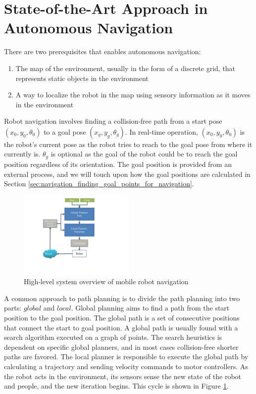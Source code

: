\section{State-of-the-Art Approach in Autonomous Navigation}
\label{sec:navigation_contemporary_navigation_practices}

There are two prerequisites that enables autonomous navigation: 

\begin{enumerate}
\item The map of the environment, usually in the form of a discrete grid, that represents static objects in the environment
\item A way to localize the robot in the map using sensory information as it moves in the environment
\end{enumerate}

Robot navigation involves finding a collision-free path from a start pose $(x_{0},y_{0},\theta_0)$ to a goal pose $(x_{g},y_{g},\theta_g)$. In real-time operation, $(x_{0},y_{0}, \theta_0)$ is the robot's current pose as the robot tries to reach to the goal pose from where it currently is. $\theta_g$ is optional as the goal of the robot could be to reach the goal position regardless of its orientation. The goal position is provided from an external process, and we will touch upon how the goal positions are calculated in Section \ref{sec:navigation_finding_goal_points_for_navigation}.



\begin{figure}[ht!]
\centering
\includegraphics[width=0.5\textwidth]{pics/navigation_overview}
\caption{High-level system overview of mobile robot navigation}
\label{fig:navigation_overview}
\end{figure}

A common approach to path planning is to divide the path planning into two parts: $global$ and $local$. Global planning aims to find a path from the start position to the goal position. The global path is a set of consecutive positions that connect the start to goal position. A global path is usually found with a search algorithm executed on a graph of points. The search heuristics is dependent on specific global planners, and in most cases collision-free shorter paths are favored. The local planner is responsible to execute the global path by calculating a trajectory and sending velocity commands to motor controllers. As the robot acts in the environment, its sensors sense the new state of the robot and people, and the new iteration begins. This cycle is shown in Figure \ref{fig:navigation_overview}. 

